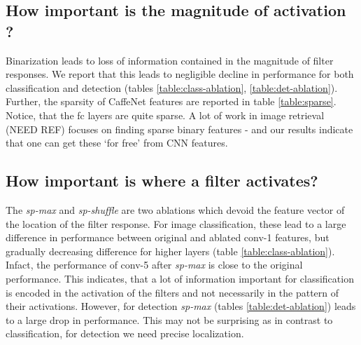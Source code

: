 \subsection{How important is the magnitude of activation ?}
\label{sub:imp-mag}
\setlength{\tabcolsep}{2pt}
\begin{table}[t!]
\begin{center}
\caption{Percentage non-zeros (sparsity) in features of various layers of CNN.}
\label{table:sparse}
\end{center}
\end{table}
\setlength{\tabcolsep}{1.4pt}

Binarization leads to loss of information contained in the magnitude of filter responses. We report that this leads to negligible decline in performance for both classification and detection (tables \ref{table:class-ablation}, \ref{table:det-ablation}). Further, the sparsity of CaffeNet features are reported in table \ref{table:sparse}. Notice, that the fc layers are quite sparse. A lot of work in image retrieval (NEED REF) focuses on finding sparse binary features - and our results indicate that one can get these `for free' from CNN features. 

\subsection{How important is where a filter activates?}
\label{sub:imp-loc}
The \textit{sp-max} and \textit{sp-shuffle} are two ablations which devoid the feature vector of the location of the filter response. For image classification, these lead to a large difference in performance between original and ablated conv-1 features, but gradually decreasing difference for higher layers (table \ref{table:class-ablation}). Infact, the performance of conv-5 after \textit{sp-max} is close to the original performance. This indicates, that a lot of information important for classification is encoded in the activation of the filters and not necessarily in the pattern of their activations. However, for detection \textit{sp-max} (tables \ref{table:det-ablation}) leads to a large drop in performance. 
This may not be surprising as in contrast to classification, for detection we need precise localization.


